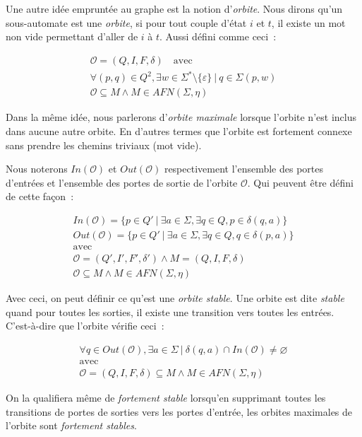 \begin{definition}
    Une autre idée empruntée au graphe est la notion d'\textit{orbite}. Nous
    dirons qu'un sous-automate est une \textit{orbite}, si pour tout couple
    d'état \(i\) et \(t\), il existe un mot non vide permettant d'aller de \(i\)
    à \(t\). Aussi défini comme ceci~:

    \begin{gather*}
        \mathcal{O} = (Q, I, F, \delta) \quad \text{avec} \\
        \forall (p, q) \in Q^2, \exists w \in \Sigma^* \setminus \{\varepsilon\} ~|~ q \in \Sigma(p, w) \\
        \mathcal{O} \subseteq M \land M \in AFN(\Sigma, \eta)
    \end{gather*}

    \noindent Dans la même idée, nous parlerons d'\textit{orbite maximale}
    lorsque l'orbite n'est inclus dans aucune autre orbite. En d'autres termes
    que l'orbite est fortement connexe sans prendre les chemins triviaux
    (mot vide).
\end{definition}

\begin{definition}
    Nous noterons \(In(\mathcal{O})\) et \(Out(\mathcal{O})\) respectivement
    l'ensemble des portes d'entrées et l'ensemble des portes de sortie de
    l'orbite \(\mathcal{O}\). Qui peuvent être défini de cette façon~:

    \begin{gather*}
        In(\mathcal{O}) = \{p \in Q' ~|~ \exists a \in \Sigma, \exists q \in Q, p \in \delta(q, a)\} \\
        Out(\mathcal{O}) = \{p \in Q' ~|~ \exists a \in \Sigma, \exists q \in Q, q \in
        \delta(p, a)\} \\
        \text{avec} \\
        \mathcal{O} = (Q', I', F', \delta') \land M = (Q, I, F, \delta) \\
        \mathcal{O} \subseteq M \land M \in AFN(\Sigma, \eta)
    \end{gather*}
\end{definition}

\begin{definition}
    Avec ceci, on peut définir ce qu'est une \textit{orbite stable}. Une orbite
    est dite \textit{stable} quand pour toutes les sorties, il existe une
    transition vers toutes les entrées. C'est-à-dire que l'orbite vérifie ceci~:

    \begin{gather*}
        \forall q \in Out(\mathcal{O}), \exists a \in \Sigma ~|~ \delta(q, a) \cap In(\mathcal{O}) \neq \varnothing \\
        \text{avec} \\
        \mathcal{O} = (Q, I, F, \delta) \subseteq M \land M \in AFN(\Sigma, \eta)
    \end{gather*}

    \noindent On la qualifiera même de \textit{fortement stable} lorsqu'en
    supprimant toutes les transitions de portes de sorties vers les portes
    d'entrée, les orbites maximales de l'orbite sont \textit{fortement stables}.
\end{definition}

